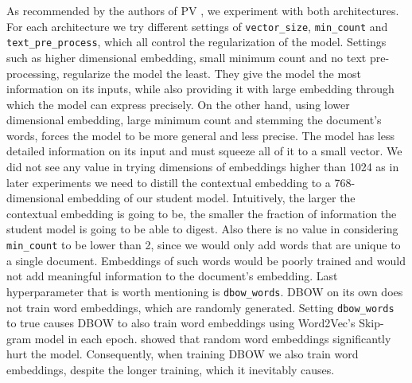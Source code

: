 As recommended by the authors of PV \citep{le2014distributed}, we experiment
with both architectures. For each architecture we try different settings of
\texttt{vector\_size}, \texttt{min\_count} and \texttt{text\_pre\_process},
which all control the regularization of the model. Settings such as higher
dimensional embedding, small minimum count and no text pre-processing,
regularize the model the least. They give the model the most information on its
inputs, while also providing it with large embedding through which the model
can express precisely. On the other hand, using lower dimensional embedding,
large minimum count and stemming the document's words, forces the model to be
more general and less precise. The model has less detailed information on its
input and must squeeze all of it to a small vector. We did not see any value in
trying dimensions of embeddings higher than 1024 as in later experiments we
need to distill the contextual embedding to a 768-dimensional embedding of our
student model. Intuitively, the larger the contextual embedding is going to be,
the smaller the fraction of information the student model is going to be able
to digest. Also there is no value in considering \texttt{min\_count} to be
lower than 2, since we would only add words that are unique to a single
document. Embeddings of such words would be poorly trained and would not add
meaningful information to the document's embedding. Last hyperparameter that is
worth mentioning is \texttt{dbow\_words}. DBOW on its own does not train word
embeddings, which are randomly generated. Setting \texttt{dbow\_words} to true
causes DBOW to also train word embeddings using Word2Vec's Skip-gram model
\citep{mikolov2013efficient} in each epoch. \cite{lau2016empirical} showed that
random word embeddings significantly hurt the model. Consequently, when
training DBOW we also train word embeddings, despite the longer training, which
it inevitably causes.

